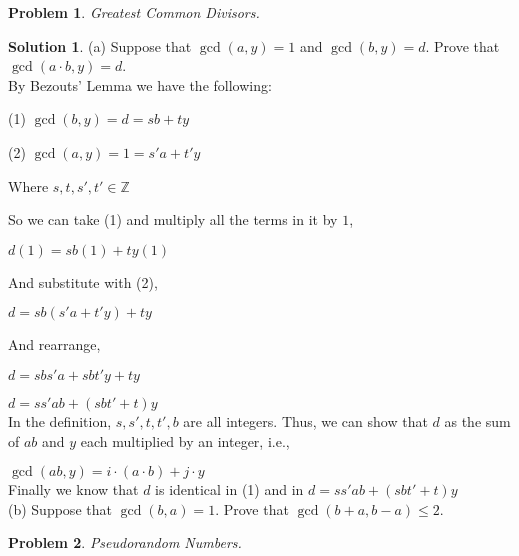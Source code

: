 \documentclass{article}
\newtheorem{problem}{Problem}
\theoremstyle{definition}
\newtheorem*{solution}{Solution}
\begin{document}
\begin{problem}

Greatest Common Divisors.

\end{problem}

\begin{solution}

(a) Suppose that \(\gcd (a,y)=1\) and \(\gcd (b,y)=d\). Prove that \(\gcd (a\cdot b,y)=d\). \\

By Bezouts' Lemma we have the following:

(1) \(\gcd (b,y)=d=sb+ty\)

(2) \(\gcd (a,y)=1=s'a+t'y\)

Where \(s,t,s',t'\in \mathbb{Z}\)

So we can take (1) and multiply all the terms in it by \(1\),

\(d(1)=sb(1)+ty(1)\)

And substitute with (2),

\(d=sb(s'a+t'y)+ty\)

And rearrange,

\(d=sbs'a+sbt'y+ty\)

\(d=ss'ab+(sbt'+t)y\) \\

In the definition, \(s,s',t,t',b\) are all integers. Thus, we can show that \(d\) as the sum of \(ab\) and \(y\) each multiplied by an integer, i.e.,

\(\gcd (ab,y)=i\cdot (a\cdot b)+j\cdot y\) \\

Finally we know that \(d\) is identical in (1) and in \(d=ss'ab+(sbt'+t)y\)\\

(b) Suppose that \(\gcd (b,a)=1\). Prove that \(\gcd (b+a,b-a)\leq 2\).



\end{solution}

\begin{problem}

Pseudorandom Numbers.

\end{problem}
\end{document}

